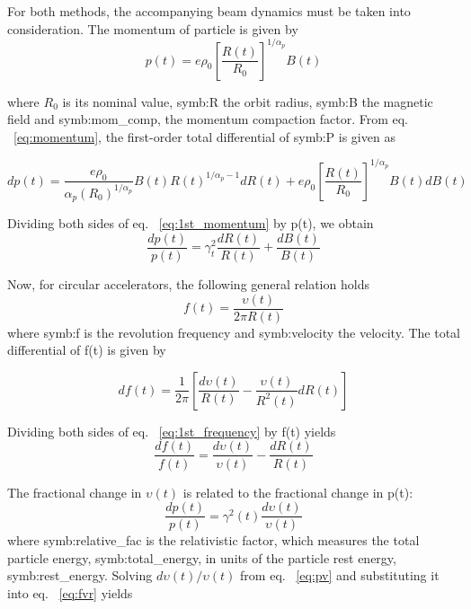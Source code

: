 For both methods, the accompanying beam dynamics must be taken into consideration. The momentum of particle is given by 
\begin{equation}
\label{eq:momentum}
p(t)=e\rho_0 [\frac {R(t)}{R_0}]^{1/\alpha_p }B(t) 
\end{equation}

where $R_0$ is its nominal value, \gls{symb:R} the orbit radius, \gls{symb:B} the magnetic field and \gls{symb:mom_comp}, the momentum compaction factor. From eq. ~\ref{eq:momentum}, the first-order total differential of \gls{symb:P} is given as

\begin{equation}
\label{eq:1st_momentum}
dp(t)=\frac{e\rho_0}{\alpha_p (R_0)^{1/\alpha_p}}B(t)R(t)^{1/\alpha_p-1}dR(t)+ e\rho_0 [\frac {R(t)}{R_0}]^{1/\alpha_p }B(t)dB(t) 
\end{equation}

Dividing both sides of eq. ~\ref{eq:1st_momentum} by p(t), we obtain
\begin{equation}
\label{eq:pRB}
\frac{dp(t)}{p(t)}={\gamma_t^2}\frac{dR(t)}{R(t)}+\frac{dB(t)}{B(t)} 
\end{equation}

Now, for circular accelerators, the following general relation holds
\begin{equation}
\label{eq:frequency}
f(t)=\frac{\upsilon(t)}{2\pi R(t)} 
\end{equation}
where \gls{symb:f} is the revolution frequency and \gls{symb:velocity} the velocity. The total differential of f(t) is given by

\begin{equation}
\label{eq:1st_frequency}
df(t)=\frac{1}{2\pi}[\frac{d\upsilon(t)}{R(t)}- \frac{\upsilon(t)}{R^2(t)}dR(t)]
\end{equation}

Dividing both sides of eq. ~\ref{eq:1st_frequency} by f(t) yields
\begin{equation}
\label{eq:fvr}
\frac{df(t)}{f(t)}=\frac{d\upsilon(t)}{\upsilon(t)}- \frac{dR(t)}{R(t)}
\end{equation}

The fractional change in $\upsilon(t)$ is related to the fractional change in p(t):
\begin{equation}
\label{eq:pv}
\frac{dp(t)}{p(t)}=\gamma^2(t)\frac{d\upsilon(t)}{\upsilon(t)}
\end{equation}
where \gls{symb:relative_fac} is the relativistic factor, which measures the total particle energy, \gls{symb:total_energy}, in units of the particle rest energy, \gls{symb:rest_energy}. Solving $d\upsilon(t)/\upsilon(t)$ from eq. ~\ref{eq:pv} and substituting it into eq. ~\ref{eq:fvr} yields

